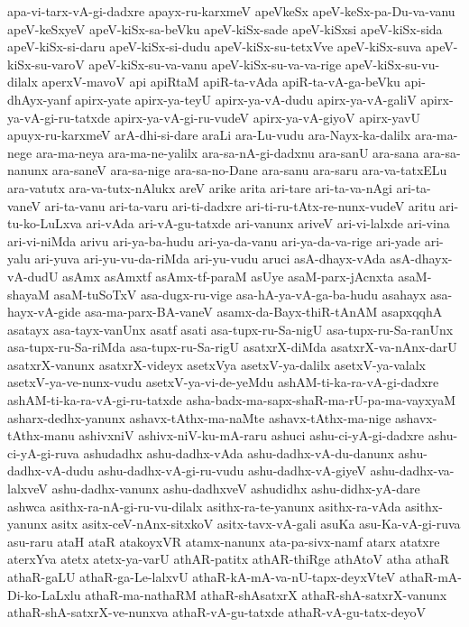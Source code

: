 {apa-vi-tarx-vA-gi-dadxre
apayx-ru-karxmeV
apeVkeSx
apeV-keSx-pa-Du-va-vanu
apeV-keSxyeV
apeV-kiSx-sa-beVku
apeV-kiSx-sade
apeV-kiSxsi
apeV-kiSx-sida
apeV-kiSx-si-daru
apeV-kiSx-si-dudu
apeV-kiSx-su-tetxVve
apeV-kiSx-suva
apeV-kiSx-su-varoV
apeV-kiSx-su-va-vanu
apeV-kiSx-su-va-va-rige
apeV-kiSx-su-vu-dilalx
aperxV-mavoV
api
apiRtaM
apiR-ta-vAda
apiR-ta-vA-ga-beVku
api-dhAyx-yanf
apirx-yate
apirx-ya-teyU
apirx-ya-vA-dudu
apirx-ya-vA-galiV
apirx-ya-vA-gi-ru-tatxde
apirx-ya-vA-gi-ru-vudeV
apirx-ya-vA-giyoV
apirx-yavU
apuyx-ru-karxmeV
arA-dhi-si-dare
araLi
ara-Lu-vudu
ara-Nayx-ka-dalilx
ara-ma-nege
ara-ma-neya
ara-ma-ne-yalilx
ara-sa-nA-gi-dadxnu
ara-sanU
ara-sana
ara-sa-nanunx
ara-saneV
ara-sa-nige
ara-sa-no-Dane
ara-sanu
ara-saru
ara-va-tatxELu
ara-vatutx
ara-va-tutx-nAlukx
areV
arike
arita
ari-tare
ari-ta-va-nAgi
ari-ta-vaneV
ari-ta-vanu
ari-ta-varu
ari-ti-dadxre
ari-ti-ru-tAtx-re-nunx-vudeV
aritu
ari-tu-ko-LuLxva
ari-vAda
ari-vA-gu-tatxde
ari-vanunx
ariveV
ari-vi-lalxde
ari-vina
ari-vi-niMda
arivu
ari-ya-ba-hudu
ari-ya-da-vanu
ari-ya-da-va-rige
ari-yade
ari-yalu
ari-yuva
ari-yu-vu-da-riMda
ari-yu-vudu
aruci
asA-dhayx-vAda
asA-dhayx-vA-dudU
asAmx
asAmxtf
asAmx-tf-paraM
asUye
asaM-parx-jAcnxta
asaM-shayaM
asaM-tuSoTxV
asa-dugx-ru-vige
asa-hA-ya-vA-ga-ba-hudu
asahayx
asa-hayx-vA-gide
asa-ma-parx-BA-vaneV
asamx-da-Bayx-thiR-tAnAM
asapxqqhA
asatayx
asa-tayx-vanUnx
asatf
asati
asa-tupx-ru-Sa-nigU
asa-tupx-ru-Sa-ranUnx
asa-tupx-ru-Sa-riMda
asa-tupx-ru-Sa-rigU
asatxrX-diMda
asatxrX-va-nAnx-darU
asatxrX-vanunx
asatxrX-videyx
asetxVya
asetxV-ya-dalilx
asetxV-ya-valalx
asetxV-ya-ve-nunx-vudu
asetxV-ya-vi-de-yeMdu
ashAM-ti-ka-ra-vA-gi-dadxre
ashAM-ti-ka-ra-vA-gi-ru-tatxde
asha-badx-ma-sapx-shaR-ma-rU-pa-ma-vayxyaM
asharx-dedhx-yanunx
ashavx-tAthx-ma-naMte
ashavx-tAthx-ma-nige
ashavx-tAthx-manu
ashivxniV
ashivx-niV-ku-mA-raru
ashuci
ashu-ci-yA-gi-dadxre
ashu-ci-yA-gi-ruva
ashudadhx
ashu-dadhx-vAda
ashu-dadhx-vA-du-danunx
ashu-dadhx-vA-dudu
ashu-dadhx-vA-gi-ru-vudu
ashu-dadhx-vA-giyeV
ashu-dadhx-va-lalxveV
ashu-dadhx-vanunx
ashu-dadhxveV
ashudidhx
ashu-didhx-yA-dare
ashwca
asithx-ra-nA-gi-ru-vu-dilalx
asithx-ra-te-yanunx
asithx-ra-vAda
asithx-yanunx
asitx
asitx-ceV-nAnx-sitxkoV
asitx-tavx-vA-gali
asuKa
asu-Ka-vA-gi-ruva
asu-raru
ataH
ataR
atakoyxVR
atamx-nanunx
ata-pa-sivx-namf
atarx
atatxre
aterxYva
atetx
atetx-ya-varU
athAR-patitx
athAR-thiRge
athAtoV
atha
athaR
athaR-gaLU
athaR-ga-Le-lalxvU
athaR-kA-mA-va-nU-tapx-deyxVteV
athaR-mA-Di-ko-LaLxlu
athaR-ma-nathaRM
athaR-shAsatxrX
athaR-shA-satxrX-vanunx
athaR-shA-satxrX-ve-nunxva
athaR-vA-gu-tatxde
athaR-vA-gu-tatx-deyoV
}
